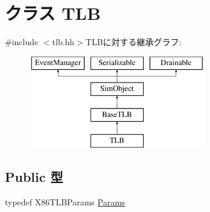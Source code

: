 \hypertarget{classX86ISA_1_1TLB}{
\section{クラス TLB}
\label{classX86ISA_1_1TLB}
}


{\ttfamily \#include $<$tlb.hh$>$}TLBに対する継承グラフ:\begin{figure}[H]
\begin{center}
\leavevmode
\includegraphics[height=4cm]{classX86ISA_1_1TLB}
\end{center}
\end{figure}
\subsection*{Public 型}
\begin{DoxyCompactItemize}
\item 
typedef X86TLBParams \hyperlink{classX86ISA_1_1TLB_a9122b46075a6970493519b96564e6356}{Params}
\end{DoxyCompactItemize}
